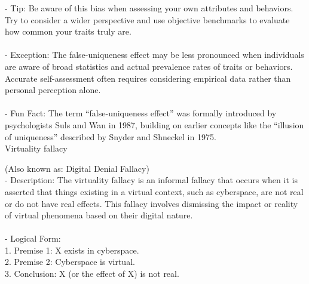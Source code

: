 \documentclass[a4paper,12pt,single,pdftex]{scrbook}
\begin{document}
    
      - Tip: Be aware of this bias when assessing your own attributes and behaviors. Try to consider a wider perspective and use objective benchmarks to evaluate how common your traits truly are.
    \\

    
      
    \\

    
      - Exception: The false-uniqueness effect may be less pronounced when individuals are aware of broad statistics and actual prevalence rates of traits or behaviors. Accurate self-assessment often requires considering empirical data rather than personal perception alone.
    \\

    
      
    \\

    
      - Fun Fact: The term “false-uniqueness effect” was formally introduced by psychologists Suls and Wan in 1987, building on earlier concepts like the “illusion of uniqueness” described by Snyder and Shneckel in 1975.
    \\

  

Virtuality fallacy
    
      (Also known as: Digital Denial Fallacy)
    \\

  
    
      - Description: The virtuality fallacy is an informal fallacy that occurs when it is asserted that things existing in a virtual context, such as cyberspace, are not real or do not have real effects. This fallacy involves dismissing the impact or reality of virtual phenomena based on their digital nature.
    \\

    
      
    \\

    
      - Logical Form:
    \\

    
        1. Premise 1: X exists in cyberspace.
    \\

    
        2. Premise 2: Cyberspace is virtual.
    \\

    
        3. Conclusion: X (or the effect of X) is not real.
    \\
\end{document}
